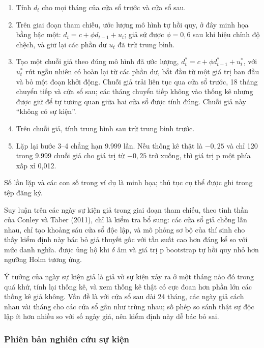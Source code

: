 \begin{vidu}
\begin{enumerate}
\item Tính $d_t$ cho mọi tháng của cửa sổ trước và cửa sổ sau.
\item Trên giai đoạn tham chiếu, ước lượng mô hình tự hồi quy, ở đây minh họa bằng bậc một: $d_t = c + \phi d_{t-1} + u_t$; giả sử được $\phi = 0{,}6$ sau khi hiệu chỉnh độ chệch, và giữ lại các phần dư $u_t$ đã trừ trung bình.
\item Tạo một chuỗi giả theo đúng mô hình đã ước lượng, $d^*_t = c + \phi d^*_{t-1} + u^*_t$, với $u^*_t$ rút ngẫu nhiên có hoàn lại từ các phần dư, bắt đầu từ một giá trị ban đầu và bỏ một đoạn khởi động. Chuỗi giả trải liên tục qua cửa sổ trước, 18 tháng chuyển tiếp và cửa sổ sau; các tháng chuyển tiếp không vào thống kê nhưng được giữ để tự tương quan giữa hai cửa sổ được tính đúng. Chuỗi giả này \enquote{không có sự kiện}.
\item Trên chuỗi giả, tính trung bình sau trừ trung bình trước.
\item Lặp lại bước 3--4 chẳng hạn 9.999 lần. Nếu thống kê thật là $-0{,}25$ và chỉ 120 trong 9.999 chuỗi giả cho giá trị từ $-0{,}25$ trở xuống, thì giá trị p một phía xấp xỉ 0,012.
\end{enumerate}
Số lần lặp và các con số trong ví dụ là minh họa; thủ tục cụ thể được ghi trong tệp đăng ký.
\end{vidu}

Suy luận trên các ngày sự kiện giả trong giai đoạn tham chiếu, theo tinh thần của Conley và Taber (2011), chỉ là kiểm tra bổ sung: các cửa sổ giả chồng lấn nhau, chỉ tạo khoảng sáu cửa sổ độc lập, và mô phỏng sơ bộ của thí sinh cho thấy kiểm định này bác bỏ giả thuyết gốc với tần suất cao hơn đáng kể so với mức danh nghĩa.  được ủng hộ khi $\delta$ âm và giá trị p bootstrap tự hồi quy nhỏ hơn ngưỡng Holm tương ứng.

Ý tưởng của ngày sự kiện giả là giả vờ sự kiện xảy ra ở một tháng nào đó trong quá khứ, tính lại thống kê, và xem thống kê thật có cực đoan hơn phần lớn các thống kê giả không. Vấn đề là với cửa sổ sau dài 24 tháng, các ngày giả cách nhau vài tháng cho các cửa sổ gần như trùng nhau; số phép so sánh thật sự độc lập ít hơn nhiều so với số ngày giả, nên kiểm định này dễ bác bỏ sai.

\subsubsection*{Phiên bản nghiên cứu sự kiện}

